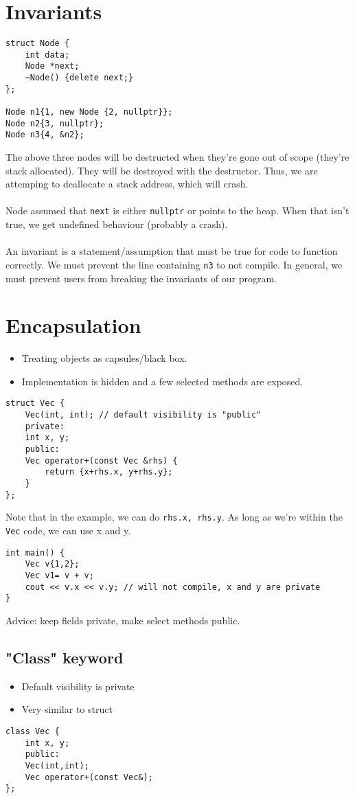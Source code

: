 \documentclass[12pt]{article}
\begin{document}
\section{Invariants}
\begin{lstlisting}
struct Node {
    int data;
    Node *next;
    ~Node() {delete next;}
};

Node n1{1, new Node {2, nullptr}};
Node n2{3, nullptr};
Node n3{4, &n2};
\end{lstlisting}
The above three nodes will be destructed when they're gone out of scope (they're stack allocated). They will be destroyed with the destructor. Thus, we are attemping to deallocate a stack address, which will crash.\\\\
Node assumed that \lstinline{next} is either \lstinline{nullptr} or points to the heap. When that isn't true, we get undefined behaviour (probably a crash).\\\\
An invariant is a statement/assumption that must be true for code to function correctly. We must prevent the line containing \lstinline{n3} to not compile. In general, we must prevent users from breaking the invariants of our program.

\section{Encapsulation}
\begin{itemize}
    \item Treating objects as capsules/black box.
    \item Implementation is hidden and a few selected methods are exposed.
\end{itemize}

\begin{lstlisting}
struct Vec {
    Vec(int, int); // default visibility is "public"
    private:
    int x, y;
    public:
    Vec operator+(const Vec &rhs) {
        return {x+rhs.x, y+rhs.y};
    }
};
\end{lstlisting}
Note that in the example, we can do \lstinline{rhs.x, rhs.y}. As long as we're within the \lstinline{Vec} code, we can use x and y.
\begin{lstlisting}
int main() {
    Vec v{1,2};
    Vec v1= v + v;
    cout << v.x << v.y; // will not compile, x and y are private
}
\end{lstlisting}
Advice: keep fields private, make select methods public.
\subsection{"Class" keyword}
\begin{itemize}
    \item Default visibility is private
    \item Very similar to struct
\end{itemize}
\begin{lstlisting}
class Vec {
    int x, y;
    public:
    Vec(int,int);
    Vec operator+(const Vec&);
};
\end{lstlisting}
\newpage
\end{document}
